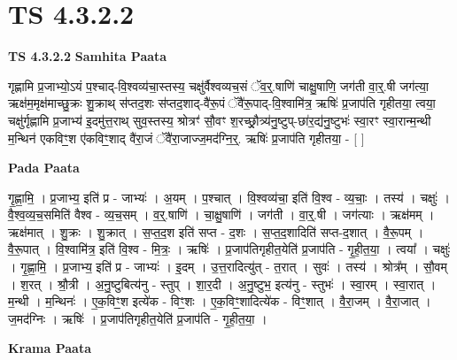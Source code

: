 \documentclass[17pt]{extarticle}
\begin{document}
\section{ TS 4.3.2.2 }

\textbf{TS 4.3.2.2 } \newline
\textbf{Samhita Paata} \newline

गृह्णामि प्र॒जाभ्यो॒ऽयं प॒श्चाद्-वि॒श्वव्य॑चा॒स्तस्य॒ चक्षु॑र्वैश्वव्यच॒सं ॅव॒र्॒.षाणि॑ चाक्षु॒षाणि॒ जग॑ती वा॒र्॒.षी जग॑त्या॒ ऋक्ष॑म॒मृक्ष॑माच्छु॒क्रः शु॒क्राथ् स॑प्तद॒शः स॑प्तद॒शाद्-वै॑रू॒पं ॅवै॑रू॒पाद्-वि॒श्वामि॑त्र॒ ऋषिः॑ प्र॒जाप॑ति गृहीतया॒ त्वया॒ चक्षु॑र्गृह्णामि प्र॒जाभ्य॑ इ॒दमु॑त्त॒राथ् सुव॒स्तस्य॒ श्रोत्रꣳ॑ सौ॒वꣳ श॒रच्छ्रौ॒त्र्य॑नु॒ष्टुप्-छा॑र॒द्य॑नु॒ष्टुभः॑ स्वा॒रꣳ स्वा॒रान्म॒न्थी म॒न्थिन॑ एकविꣳ॒॒श ए॑कविꣳ॒॒शाद् वै॑रा॒जं ॅवै॑रा॒जाज्ज॒मद॑ग्नि॒र्॒. ऋषिः॑ प्र॒जाप॑ति गृहीतया॒ - [  ] \newline

\textbf{Pada Paata} \newline

गृ॒ह्णा॒मि॒ । प्र॒जाभ्य॒ इति॑ प्र - जाभ्यः॑ । अ॒यम् । प॒श्चात् । वि॒श्वव्य॑चा॒ इति॑ वि॒श्व - व्य॒चाः॒ । तस्य॑ । चक्षुः॑ । वै॒श्व॒व्य॒च॒समिति॑ वैश्व - व्य॒च॒सम् । व॒र्॒.षाणि॑ । चा॒क्षु॒षाणि॑ । जग॑ती । वा॒र्॒.षी । जग॑त्याः । ऋक्ष॑मम् । ऋक्ष॑मात् । शु॒क्रः । शु॒क्रात् । स॒प्त॒द॒श इति॑ सप्त - द॒शः । स॒प्त॒द॒शादिति॑ सप्त-द॒शात् । वै॒रू॒पम् । वै॒रू॒पात् । वि॒श्वामि॑त्र॒ इति॑ वि॒श्व - मि॒त्रः॒ । ऋषिः॑ । प्र॒जाप॑तिगृहीत॒येति॑ प्र॒जाप॑ति - गृ॒ही॒त॒या॒ । त्वया᳚ । चक्षुः॑ । गृ॒ह्णा॒मि॒ । प्र॒जाभ्य॒ इति॑ प्र - जाभ्यः॑ । इ॒दम् । उ॒त्त॒रादित्यु॑त् - त॒रात् । सुवः॑ । तस्य॑ । श्रोत्र᳚म् । सौ॒वम् । श॒रत् । श्रौ॒त्री । अ॒नु॒ष्टुबित्य॑नु - स्तुप् । शा॒र॒दी । अ॒नु॒ष्टुभ॒ इत्य॑नु - स्तुभः॑ । स्वा॒रम् । स्वा॒रात् । म॒न्थी । म॒न्थिनः॑ । ए॒क॒विꣳ॒॒श इत्ये॑क - विꣳ॒॒शः । ए॒क॒विꣳ॒॒शादित्ये॑क - विꣳ॒॒शात् । वै॒रा॒जम् । वै॒रा॒जात् । ज॒मद॑ग्निः । ऋषिः॑ । प्र॒जाप॑तिगृहीत॒येति॑ प्र॒जाप॑ति - गृ॒ही॒त॒या॒ ।  \newline


\textbf{Krama Paata} \newline
\end{document}
